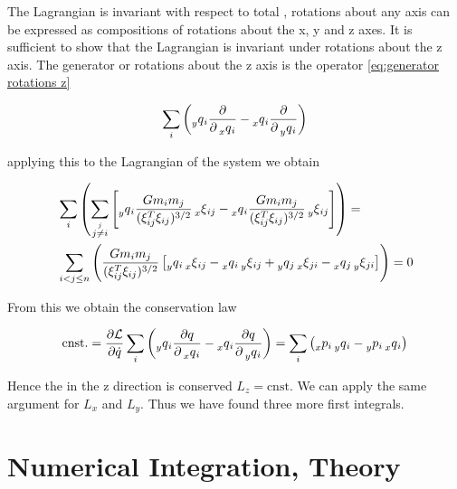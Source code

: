 \documentclass[12pt]{article}
\begin{document}
The Lagrangian is invariant with respect to total , rotations about any axis can be expressed as compositions of rotations about the x, y and z axes. It is sufficient to show that the Lagrangian is invariant under rotations about the z axis. The generator or rotations about the z axis is the operator \eqref{eq:generator rotations z}

\begin{equation}\label{eq:generator rotations z}
    \sum_i \left(\prescript{}{y}{q}_i \frac{\partial}{\partial \prescript{}{x}{q}_i} - \prescript{}{x}{q}_i \frac{\partial}{\partial \prescript{}{y}{q}_i} \right)
\end{equation}

applying this to the Lagrangian of the system we obtain

\begin{equation}\label{eq:rotate lagrangian}
\begin{split}
&   \sum_i\left(
    \sum_{\stackrel{j}{j\neq i}}\left[
    \prescript{}{y}{q}_i \frac{Gm_im_j}{(\xi_{ij}^T\xi_{ij})^{3/2}}\prescript{}{x}{\xi}_{ij} - \prescript{}{x}{q}_i \frac{Gm_im_j}{(\xi_{ij}^T\xi_{ij})^{3/2}} \prescript{}{y}{\xi}_{ij}
    \right]\right)
    =\\
&   \sum_{i<j\leq n}\left(
    \frac{Gm_im_j}{(\xi_{ij}^T\xi_{ij})^{3/2}} \left[
    \prescript{}{y}{q}_i \prescript{}{x}{\xi}_{ij} - \prescript{}{x}{q}_i \prescript{}{y}{\xi}_{ij} + \prescript{}{y}{q}_j \prescript{}{x}{\xi}_{ji} - \prescript{}{x}{q}_j \prescript{}{y}{\xi}_{ji}
    \right]\right) = 0
\end{split}
\end{equation}

From this we obtain the conservation law 

\begin{equation}\label{eq:conservation of z angular momentum}
    \text{cnst.} = \frac{\partial\mathcal L}{\partial \dot q}\sum_i \left( \prescript{}{y}{q}_i \frac{\partial q}{\partial \prescript{}{x}{q}_i} - \prescript{}{x}{q}_i \frac{\partial q}{\partial \prescript{}{y}{q}_i} \right)
    =
    \sum_i \left( \prescript{}{x}{p}_i\prescript{}{y}{q}_i - \prescript{}{y}{p}_i \prescript{}{x}{q}_i \right)
\end{equation}

Hence the  in the z direction is conserved $L_z = \text{cnst}$. We can apply the same argument for $L_x$ and $L_y$. Thus we have found three more first integrals.

\section{Numerical Integration, Theory}
\end{document}
